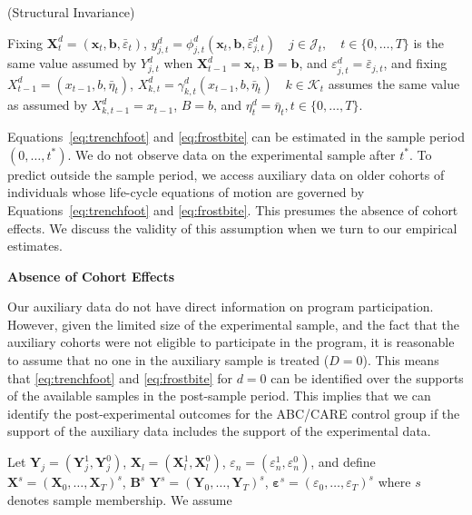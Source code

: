 \begin{assumption}\label{ass:butts}
(Structural Invariance)\\
\begin{spacing}{1.5}
\noindent Fixing $\bm{X}^d_t = (\bm{x}_t, \bm{b},\bar{\varepsilon}_t)$, $y^d_{j,t} = \phi^d_{j,t} (\bm{x}_t, \bm{b},  \bar{\varepsilon}^d_{j,t}) \quad j \in \mathcal{J}_t, \quad t \in \{0,\ldots,T\}$ is the same value assumed by $Y^d_{j,t}$ when $\bm{X}^d_{t-1} = \bm{x}_t$, $\bm{B} = \bm{b}$, and $\varepsilon^d_{j,t} = \bar{\varepsilon}_{j,t}$, and fixing $X^d_{t-1} = (x_{t-1}, b, \bar{\eta}_t)$, $X^d_{k,t} = \gamma^d_{k,t} (x_{t-1}, b, \bar{\eta}_t) \quad k \in \mathcal{K}_t$ assumes the same value as assumed by $X^d_{k,t-1} = x_{t-1}$, $B = b$, and $\eta^d_t = \bar{\eta}_t, t \in \{0,\dots,T\}$.
\end{spacing}
\end{assumption}

Equations~\eqref{eq:trenchfoot} and \eqref{eq:frostbite} can be estimated in the sample period $(0,\ldots,t^{*})$. We do not observe data on the experimental sample after $t^{*}$. To predict outside the sample period, we access auxiliary data on older cohorts of individuals whose life-cycle equations of motion are governed by Equations~\eqref{eq:trenchfoot} and \eqref{eq:frostbite}. This presumes the absence of cohort effects. We discuss the validity of this assumption when we turn to our empirical estimates.

\begin{assumption}\label{ass:crotchrot}
\textbf{Absence of Cohort Effects}
\end{assumption}

Our auxiliary data do not have direct information on program participation. However, given the limited size of the experimental sample, and the fact that the auxiliary cohorts were not eligible to participate in the program, it is reasonable to assume that no one in the auxiliary sample is treated ($D=0$). This means that \eqref{eq:trenchfoot} and \eqref{eq:frostbite} for $d=0$ can be identified over the supports of the available samples in the post-sample period. This implies that we can identify the post-experimental outcomes for the ABC/CARE control group if the support of the auxiliary data includes the support of the experimental data.

Let $\bm{Y}_j = (\bm{Y}^1_j, \bm{Y}^0_j)$, $\bm{X}_l = (\bm{X}^1_l, \bm{X}^0_l)$, $\varepsilon_n = (\varepsilon^1_n, \varepsilon^0_n)$, and define $\bm{X}^s = (\bm{X}_0,\dots,\bm{X}_T)^s$, $\bm{B}^s$ $\bm{Y}^s = (\bm{Y}_0,\dots,\bm{Y}_T)^s$, $\bm{\varepsilon}^s = (\varepsilon_0,\dots,\varepsilon_{T})^s$ where $s$ denotes sample membership. We assume

